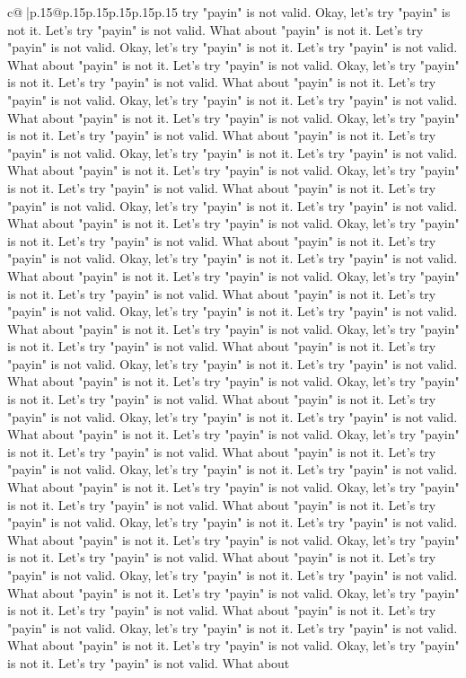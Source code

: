 \documentclass{article}
\begin{document}
{\begin{supertabular}{c@{$\;$}|p{.15\linewidth}@{}p{.15\linewidth}p{.15\linewidth}p{.15\linewidth}p{.15\linewidth}p{.15\linewidth}}
{{{try "payin" is not valid. Okay, let's try "payin" is not it. Let's try "payin" is not valid. What about "payin" is not it. Let's try "payin" is not valid. Okay, let's try "payin" is not it. Let's try "payin" is not valid. What about "payin" is not it. Let's try "payin" is not valid. Okay, let's try "payin" is not it. Let's try "payin" is not valid. What about "payin" is not it. Let's try "payin" is not valid. Okay, let's try "payin" is not it. Let's try "payin" is not valid. What about "payin" is not it. Let's try "payin" is not valid. Okay, let's try "payin" is not it. Let's try "payin" is not valid. What about "payin" is not it. Let's try "payin" is not valid. Okay, let's try "payin" is not it. Let's try "payin" is not valid. What about "payin" is not it. Let's try "payin" is not valid. Okay, let's try "payin" is not it. Let's try "payin" is not valid. What about "payin" is not it. Let's try "payin" is not valid. Okay, let's try "payin" is not it. Let's try "payin" is not valid. What about "payin" is not it. Let's try "payin" is not valid. Okay, let's try "payin" is not it. Let's try "payin" is not valid. What about "payin" is not it. Let's try "payin" is not valid. Okay, let's try "payin" is not it. Let's try "payin" is not valid. What about "payin" is not it. Let's try "payin" is not valid. Okay, let's try "payin" is not it. Let's try "payin" is not valid. What about "payin" is not it. Let's try "payin" is not valid. Okay, let's try "payin" is not it. Let's try "payin" is not valid. What about "payin" is not it. Let's try "payin" is not valid. Okay, let's try "payin" is not it. Let's try "payin" is not valid. What about "payin" is not it. Let's try "payin" is not valid. Okay, let's try "payin" is not it. Let's try "payin" is not valid. What about "payin" is not it. Let's try "payin" is not valid. Okay, let's try "payin" is not it. Let's try "payin" is not valid. What about "payin" is not it. Let's try "payin" is not valid. Okay, let's try "payin" is not it. Let's try "payin" is not valid. What about "payin" is not it. Let's try "payin" is not valid. Okay, let's try "payin" is not it. Let's try "payin" is not valid. What about "payin" is not it. Let's try "payin" is not valid. Okay, let's try "payin" is not it. Let's try "payin" is not valid. What about "payin" is not it. Let's try "payin" is not valid. Okay, let's try "payin" is not it. Let's try "payin" is not valid. What about "payin" is not it. Let's try "payin" is not valid. Okay, let's try "payin" is not it. Let's try "payin" is not valid. What about "payin" is not it. Let's try "payin" is not valid. Okay, let's try "payin" is not it. Let's try "payin" is not valid. What about "payin" is not it. Let's try "payin" is not valid. Okay, let's try "payin" is not it. Let's try "payin" is not valid. What about "payin" is not it. Let's try "payin" is not valid. Okay, let's try "payin" is not it. Let's try "payin" is not valid. What about "payin" is not it. Let's try "payin" is not valid. Okay, let's try "payin" is not it. Let's try "payin" is not valid. What about "payin" is not it. Let's try "payin" is not valid. Okay, let's try "payin" is not it. Let's try "payin" is not valid. What about }}}
\end{supertabular}}
\end{document}
